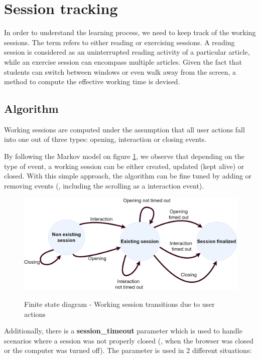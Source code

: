 \section{Session tracking}\label{p02:session_tracking}

In order to understand the learning process, we need to keep track of the working sessions. The term refers to either reading or exercising sessions. A reading session is considered as an uninterrupted reading activity of a particular article, while an exercise session can encompass multiple articles. Given the fact that students can switch between windows or even walk away from the screen, a method to compute the effective working time is devised. 

\subsection{Algorithm}
Working sessions are computed under the assumption that all user actions fall into one out of three types: opening, interaction or closing events.

By following the Markov model on figure \ref{fig:markov_diagram}, we observe that depending on the type of event, a working session can be either created, updated (kept alive) or closed. With this simple approach, the algorithm can be fine tuned by adding or removing events (\eg, including the scrolling as a interaction event).

\begin{figure}[bth]
	{\includegraphics[width=1\linewidth]{gfx/Finite_state_machine_diagramv2}} \quad
	\caption[Finite state diagram - Working session transitions due to user actions]{Finite state diagram - Working session transitions due to user actions}\label{fig:markov_diagram}
\end{figure}

Additionally, there is a \textbf{session\_timeout} parameter which is used to handle scenarios where a session was not properly closed (\eg, when the browser was closed or the computer was turned off). The parameter is used in 2 different situations:

